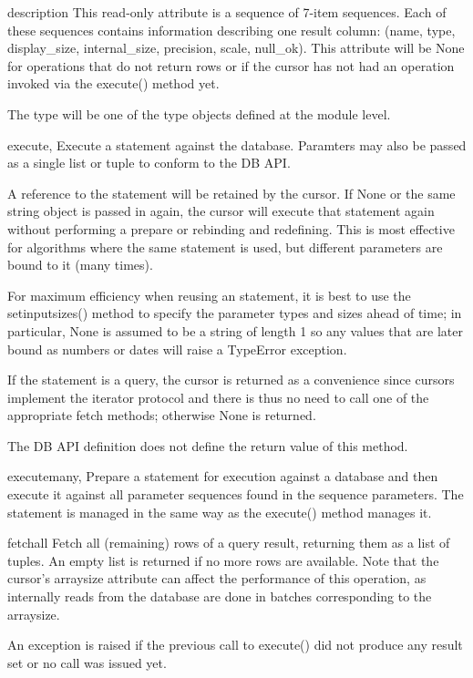 \documentclass{manual}
\begin{document}
\begin{datadesc}{description}
  This read-only attribute is a sequence of 7-item sequences. Each of these
  sequences contains information describing one result column: (name, type,
  display_size, internal_size, precision, scale, null_ok). This attribute will
  be None for operations that do not return rows or if the cursor has not had
  an operation invoked via the execute() method yet.

  The type will be one of the type objects defined at the module level.
\end{datadesc}

\begin{funcdesc}{execute}{, {}}
  Execute a statement against the database. Paramters may also be passed as a
  single list or tuple to conform to the DB API.

  A reference to the statement will be retained by the cursor. If None or the
  same string object is passed in again, the cursor will execute that
  statement again without performing a prepare or rebinding and redefining.
  This is most effective for algorithms where the same statement is used, but
  different parameters are bound to it (many times).

  For maximum efficiency when reusing an statement, it is best to use the
  setinputsizes() method to specify the parameter types and sizes ahead of
  time; in particular, None is assumed to be a string of length 1 so any
  values that are later bound as numbers or dates will raise a TypeError
  exception.

  If the statement is a query, the cursor is returned as a convenience since
  cursors implement the iterator protocol and there is thus no need to call
  one of the appropriate fetch methods; otherwise None is returned.

   The DB API definition does not define the return value of this
  method.
\end{funcdesc}

\begin{funcdesc}{executemany}{, }
  Prepare a statement for execution against a database and then execute it
  against all parameter sequences found in the sequence parameters. The
  statement is managed in the same way as the execute() method manages it.
\end{funcdesc}

\begin{funcdesc}{fetchall}{}
  Fetch all (remaining) rows of a query result, returning them as a list of
  tuples. An empty list is returned if no more rows are available. Note that
  the cursor's arraysize attribute can affect the performance of this
  operation, as internally reads from the database are done in batches
  corresponding to the arraysize.

  An exception is raised if the previous call to execute() did not produce any
  result set or no call was issued yet.
\end{funcdesc}
\end{document}
